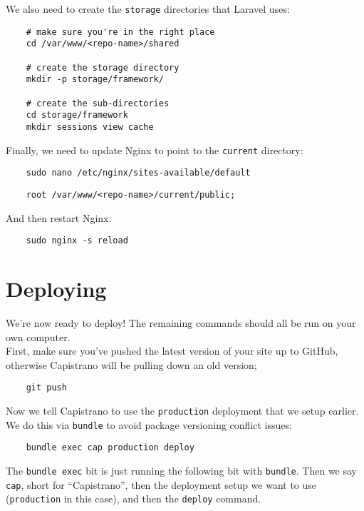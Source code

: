 We also need to create the \texttt{storage} directories that Laravel uses:

\begin{verbatim}
    # make sure you're in the right place
    cd /var/www/<repo-name>/shared

    # create the storage directory
    mkdir -p storage/framework/

    # create the sub-directories
    cd storage/framework
    mkdir sessions view cache
\end{verbatim}


Finally, we need to update Nginx to point to the \texttt{current} directory:

\begin{verbatim}
    sudo nano /etc/nginx/sites-available/default
\end{verbatim}

\begin{verbatim}
    root /var/www/<repo-name>/current/public;
\end{verbatim}

And then restart Nginx:

\begin{verbatim}
    sudo nginx -s reload
\end{verbatim}



\section{Deploying}

We're now ready to deploy! The remaining commands should all be run on your own computer.
\\

First, make sure you've pushed the latest version of your site up to GitHub, otherwise Capistrano will be pulling down an old version;

\begin{verbatim}
    git push
\end{verbatim}

Now we tell Capistrano to use the \texttt{production} deployment that we setup earlier. We do this via \texttt{bundle} to avoid package versioning conflict issues:

\begin{verbatim}
    bundle exec cap production deploy
\end{verbatim}

The \texttt{bundle exec} bit is just running the following bit with \texttt{bundle}. Then we say \texttt{cap}, short for ``Capistrano'', then the deployment setup we want to use (\texttt{production} in this case), and then the \texttt{deploy} command.
\\

